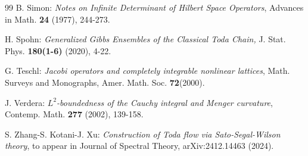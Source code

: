 \documentclass[a4paper]{article}%
\begin{document}
\begin{thebibliography}{99}
B. Simon: \textit{Notes on Infinite Determinant of Hilbert Space
Operators}, Advances in Math. \textbf{24} (1977), 244-273.

H. Spohn: \textit{Generalized Gibbs Ensembles of the Classical
Toda Chain, }J. Stat. Phys.\textit{ }\textbf{180(1-6) }(2020), 4-22.

G. Teschl: \textit{Jacobi operators and completely integrable
nonlinear lattices}, Math. Surveys and Monographs, Amer. Math. Soc.
\textbf{72}(2000).

J. Verdera: $L^{2}$\textit{-boundedness of the Cauchy integral and
Menger curvature}, Contemp. Math. \textbf{277} (2002), 139-158.

S. Zhang-S. Kotani-J. Xu: \textit{Construction of Toda flow via
Sato-Segal-Wilson theory}, to appear in Journal of Spectral Theory,
arXiv:2412.14463 (2024).
\end{thebibliography}
\end{document}
